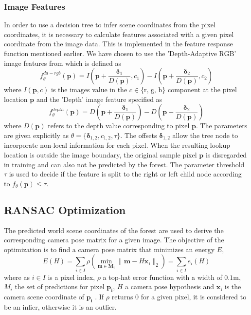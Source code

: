 \documentclass[final]{cvpr}
\begin{document}
\subsubsection{Image Features}
In order to use a decision tree to infer scene coordinates from the pixel coordinates,
it is necessary to calculate features associated with a given pixel coordinate from the
image data. This is implemented in the feature response function mentioned earlier.
We have chosen to use the 'Depth-Adaptive RGB' image features from \cite{shotton2013} which
is defined as
\begin{equation}
	f_{\theta}^{da-rgb}(\boldsymbol{p}) = I\left(\boldsymbol{p} + \frac{\boldsymbol{\delta}_1}{D(\boldsymbol{p})}, c_1\right)
	- I\left(\boldsymbol{p} + \frac{\boldsymbol{\delta}_2}{D(\boldsymbol{p})}, c_2\right)
\end{equation}
where $I(\boldsymbol{p}, c)$ is the images value in the $c \in \{\text{r, g, b}\}$ component at
the pixel location $\boldsymbol{p}$ and the 'Depth' image feature specified as
\begin{equation}
	f_{\theta}^{depth}(\boldsymbol{p}) = D\left(\boldsymbol{p} + \frac{\boldsymbol{\delta}_1}{D(\boldsymbol{p})}\right)
	- D\left(\boldsymbol{p} + \frac{\boldsymbol{\delta}_2}{D(\boldsymbol{p})}\right)
\end{equation}
where $D(\boldsymbol{p})$ refers to the depth value corresponding to pixel $\boldsymbol{p}$.
The parameters are given explicitly as $\theta = \{\boldsymbol{\delta}_{1,2}, c_{1,2}, \tau\}$. 
The offsets $\boldsymbol{\delta}_{1,2}$
allow the tree node to incorporate non-local information for each pixel. When the resulting
lookup location is outside the image boundary, the original sample pixel $\boldsymbol{p}$ is
disregarded in training and can also not be predicted by the forest. The parameter threshold 
$\tau$ is used to decide if the feature is split to the right or left child node according to 
$f_{\theta}(\boldsymbol{p}) \leq \tau$.


\subsection{RANSAC Optimization}
The predicted world scene coordinates of the forest are used to derive the corresponding camera pose matrix for a given image. 
The objective of the optimization is to find a camera pose matrix that minimizes an energy $E$,
\begin{equation}\label{energy_function}
	E(H) = \sum_{i \in I} \rho(\min_{\boldsymbol{m} \in \boldsymbol{M_{i}}} 
	\| \boldsymbol{m} - H \boldsymbol{x_{i}} \|_{2}) = \sum_{i \in I}e_{i}(H)
\end{equation}
where as $i \in I$ is a pixel index,  $\rho$ a top-hat error function with a width of $0.1$m, $M_{i}$ 
the set of predictions for pixel $\boldsymbol{p_{i}}$, $H$ a camera pose hypothesis and $\boldsymbol{x_{i}}$ is the camera
scene coordinate of $\boldsymbol{p_{i}}$ \cite{shotton2013}. If $\rho$ returns $0$ for a given pixel, it is considered
to be an inlier, otherwise it is an outlier.
\end{document}
